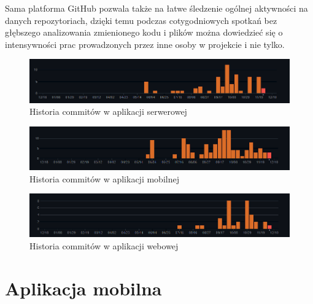 \documentclass[a4paper,twoside,12pt]{book}
\begin{document}
Sama platforma GitHub pozwala także na łatwe śledzenie ogólnej aktywności na danych repozytoriach, dzięki temu podczas cotygodniowych spotkań bez głębszego analizowania zmienionego kodu i plików można dowiedzieć się o intensywności prac prowadzonych przez inne osoby w projekcie i nie tylko.
\begin{figure}[H]
    \centering
    \includegraphics[width=1\textwidth]{github_ss/backend.png}
    \caption{Historia commitów w aplikacji serwerowej}
\end{figure}
\begin{figure}[H]
    \centering
    \includegraphics[width=1\textwidth]{github_ss/mobile.png}
    \caption{Historia commitów w aplikacji mobilnej}
\end{figure}
\begin{figure}[H]
    \centering
    \includegraphics[width=1\textwidth]{github_ss/front.png}
    \caption{Historia commitów w aplikacji webowej}
\end{figure}
 


\chapter{Aplikacja mobilna}
\label{ch:05}


%      
\end{document}
